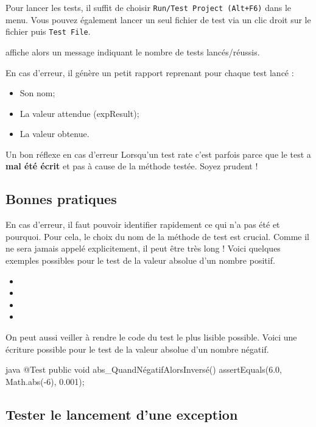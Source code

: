 \documentclass[a4paper,11pt]{style-esi/td}
\begin{document}
Pour lancer les tests,
il suffit de choisir \texttt{Run/Test Project (Alt+F6)} dans le menu.
Vous pouvez également lancer un seul fichier de test
via un clic droit sur le fichier puis \texttt{Test File}.

 affiche alors un message
indiquant le nombre de tests lancés/réussis.

En cas d'erreur,
il génère un petit rapport reprenant pour chaque test lancé :
\begin{itemize}
	\item Son nom;
	\item La valeur attendue (expResult);
	\item La valeur obtenue.
\end{itemize}

\begin{infoit}{Un bon réflexe en cas d'erreur}
	Lorsqu'un test rate c'est parfois parce que le test a \textbf{mal été écrit}
	et pas à cause de la méthode testée. Soyez prudent !
\end{infoit}

\subsection{Bonnes pratiques}

En cas d'erreur,
il faut pouvoir identifier rapidement ce qui n'a pas été et pourquoi.
Pour cela, le choix du nom  de la méthode de test est crucial.
Comme il ne sera jamais appelé explicitement,
il peut être très long !
Voici quelques exemples possibles pour le test de la valeur absolue d'un nombre positif.
\begin{itemize}
	\item {}
	\item {}
	\item {}
	\item {}
\end{itemize}

On peut aussi veiller à rendre le code du test le plus lisible possible.
Voici une écriture possible pour le test de la valeur absolue d'un nombre négatif.
\begin{Code}{java}
	@Test
	public void abs_QuandNégatifAlorsInversé() {
		assertEquals(6.0, Math.abs(-6), 0.001);
	}
\end{Code}

\subsection{Tester le lancement d'une exception}
\end{document}
